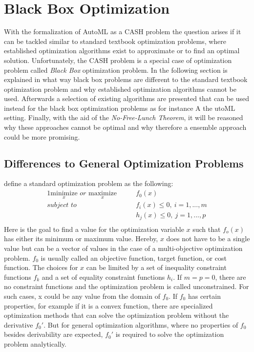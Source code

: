 \section{Black Box Optimization}
\label{sec:theory:optimization}
With the formalization of AutoML as a CASH problem the question arises if it can be tackled similar to standard textbook optimization problems, where established optimization algorithms exist to approximate or to find an optimal solution.
Unfortunately, the CASH problem is a special case of optimization problem called \textit{Black Box} optimization problem.\newline
In the following section is explained in what way black box problems are different to the standard textbook optimization problem and why established optimization algorithms cannot be used.
Afterwards a selection of existing algorithms are presented that can be used instead for the black box optimization problems as for instance A the utoML setting.
Finally, with the aid of the \textit{No-Free-Lunch Theorem}, it will be reasoned why these approaches cannot be optimal and why therefore a ensemble approach could be more promising.

\subsection{Differences to General Optimization Problems}
\label{sec:theory:optimization:differences}
\textcite{Boyd-Optimization} define a standard optimization problem as the following:
\begin{alignat*}{1}
    \underset{x}{\mathrm{minimize}} \textit{ or } \underset{x}{\mathrm{maximize}} \qquad & f_0(x)\\
    \textit{subject to} \qquad & f_i(x) \leq 0,\> i=1,...,m\\
                        &  h_j(x) \leq 0,\> j=1,...,p\\
\end{alignat*}
Here is the goal to find a value for the optimization variable $x$ such that $f_o(x)$ has either its minimum or maximum value.
Hereby, $x$ does not have to be a single value but can be a vector of values in the case of a multi-objective optimization problem.
$f_0$ is usually called an objective function, target function, or cost function.\newline
The choices for $x$ can be limited by a set of inequality constraint functions $f_k$ and a set of equality constraint functions $h_i$.
If $m=p=0$, there are no constraint functions and the optimization problem is called unconstrained.
For such cases, x could be any value from the domain of $f_0$.\newline
If $f_0$ has certain properties, for example if it is a convex function, there are specialized optimization methods that can solve the optimization problem without the derivative $f_0'$.
But for general optimization algorithms, where no properties of $f_0$ besides derivability are expected, $f_0'$ is required to solve the optimization problem analytically.


